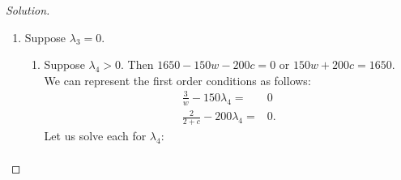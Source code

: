 \documentclass[12pt]{article}
\theoremstyle{definition}
\theoremstyle{remark}
\def\la{\lambda}
\begin{document}
\begin{proof}[Solution]
\begin{enumerate}
\begin{enumerate}
\begin{enumerate}
\begin{align*}
        \la_3 + 150\la_4 =& \frac{3}{7} \\
        \la_3 + 200\la_4 =& \frac{2}{5}.
      \end{align*}
      Solving for $\la_3$ in (\ref{eq:fo1}), we obtain $\la_3 = \frac{3}{7} - 150\la_4$. Substituting into (\ref{eq:f02}), we obtain
      \begin{align*}
        &           &\frac{3}{7} - 150\la_4 + 200\la_4 =& \frac{2}{5} \\
        & \implies  &\frac{3}{7} - \frac{2}{5} =& -50\la_4 \\
        & \implies  &\frac{1}{35} =& -50\la_4 \\
        & \implies  &\la_4 =& -\frac{10}{7}.
      \end{align*}
      But $\la_4 > 0$. $\rightarrow \leftarrow$.
      \item Then $\la_4 = 0$. We may rewrite our first order conditions as follows:
      \begin{align*}
        \frac{3}{w} - \lambda_3 =& 0 \\
        \frac{2}{12-w} - \lambda_3 =& 0
      \end{align*}
      So $\la_3 = \frac{3}{w}$. Substituting this into the second line above, we obtain
      \begin{align*}
        &          & \frac{2}{12-w} =& \frac{3}{w} \\
        & \implies & 2w =& 3(12-w) \\
        & \implies & 5w =& 36 \\
        & \implies & w =& \frac{36}{5}.
      \end{align*}
      Then $c = 10 - \frac{36}{5} = \frac{14}{5}$. Moreover, $\la_3 = \frac{15}{36}$.
      All conditions are satisfied, so $w = \frac{36}{5}, c = \frac{14}{5}$ is a candidate solution. Let us proceed to check for others.
    \end{enumerate}
    \item Suppose $\la_3 = 0$.
    \begin{enumerate}
      \item Suppose $\la_4 > 0$. Then $1650 - 150w - 200c = 0$ or $150w + 200c = 1650$. We can represent the first order conditions as follows:
      \begin{align*}
        \frac{3}{w} - 150\la_4 =& 0 \\
        \frac{2}{2+c} - 200\la_4 =& 0.
      \end{align*}
      Let us solve each for $\la_4$:
      \begin{align*}

\end{align*}
\end{enumerate}
\end{enumerate}
\end{enumerate}
\end{proof}
\end{document}

